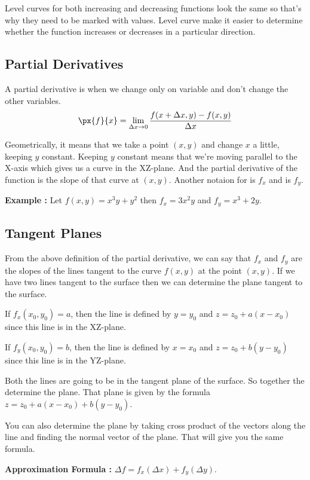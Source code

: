 Level curves for both increasing and decreasing functions look the same so that's why they need to be marked with values.
Level curve make it easier to determine whether the function increases or decreases in a particular direction.


\subsection{Partial Derivatives}

A partial derivative is when we change only on variable and don't change the other variables.
$$ \px{f}{x} = \lim_{\Delta x \to 0} \frac{f(x+\Delta x, y) - f(x, y)}{\Delta x} $$

Geometrically, it means that we take a point $(x, y)$ and change $x$ a little, keeping $y$ constant.
Keeping $y$ constant means that we're moving parallel to the X-axis which gives us a curve in the XZ-plane.
And the partial derivative of the function is the slope of that curve at $(x, y)$.
Another notaion for  is $f_x$ and  is $f_y$.


{\bf Example : } Let $f(x, y) = x^3 y  + y^2$ then $f_x = 3x^2y$ and $f_y = x^3 + 2y$.

\subsection{Tangent Planes}

From the above definition of the partial derivative, we can say that $f_x$ and $f_y$ are the slopes of the lines tangent to the curve $f(x, y)$ at the point $(x ,y)$.
If we have two lines tangent to the surface then we can determine the plane tangent to the surface.

If $f_x(x_0, y_0) = a$, then the line is defined by $y = y_0$ and $z = z_0 + a(x-x_0)$ since this line is in the XZ-plane.

If $f_y(x_0, y_0) = b$, then the line is defined by $x = x_0$ and $z = z_0 + b(y-y_0)$ since this line is in the YZ-plane.

Both the lines are going to be in the tangent plane of the surface. So together the determine the plane. 
That plane is given by the formula $z = z_0 + a(x-x_0) + b(y-y_0)$.

You can also determine the plane by taking cross product of the vectors along the line and finding the normal vector of the plane. 
That will give you the same formula.


{\bf Approximation Formula : } $\Delta f = f_x (\Delta x) + f_y (\Delta y)$.